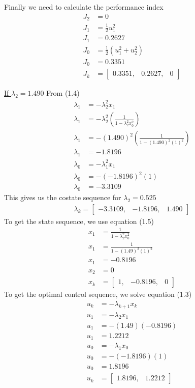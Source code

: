 \documentclass{article}
\begin{document}
  Finally we need to calculate the performance index
  \begin{align*}
	  J_2&=0 \\
	  J_1&=\frac{1}{2}u_1^2 \\
	  J_1&=0.2627 \\
	  J_0&=\frac{1}{2}(u_1^2+u_2^2) \\
	  J_0&=0.3351 \\
	  J_k&=\begin{bmatrix}
		  0.3351, & 0.2627, & 0
	  \end{bmatrix}
  \end{align*}

  \underline{If $\lambda_2=1.490$} \newline \newline
  From (1.4)
  \begin{align*}
	  \lambda_1&=-\lambda_2^2x_1 \\
	  \lambda_1&=-\lambda_2^2(\frac{1}{1-\lambda_2^2x_0^2}) \\
	  \lambda_1&=-(1.490)^2(\frac{1}{1-(1.490)^2(1)^2}) \\
	  \lambda_1&=-1.8196 \\
	  \lambda_0&=-\lambda_1^2x_1 \\
	  \lambda_0&=-(-1.8196)^2(1) \\
	  \lambda_0&=-3.3109
  \end{align*}
  This gives us the costate sequence for $\lambda_2=0.525$
  \begin{align*}
	  \lambda_k=\begin{bmatrix}
		  -3.3109, & -1.8196, & 1.490
	  \end{bmatrix}
  \end{align*}
  To get the state sequence, we use equation (1.5)
  \begin{align*}
	  x_1&=\frac{1}{1-\lambda_2^2x_0^2} \\
	  x_1&=\frac{1}{1-(1.49)^2(1)^2} \\
	  x_1&=-0.8196 \\
	  x_2&=0  \\
	  x_k&=\begin{bmatrix}
		  1, & -0.8196, & 0
	  \end{bmatrix}
  \end{align*}
  To get the optimal control sequence, we solve equation (1.3)
  \begin{align*}
	  u_k&=-\lambda_{k+1}x_k \\
	  u_1&=-\lambda_2x_1 \\
	  u_1&=-(1.49)(-0.8196) \\
	  u_1&=1.2212 \\
	  u_0&=-\lambda_1x_0 \\
	  u_0&=-(-1.8196)(1) \\
	  u_0&=1.8196 \\
	  u_k&=\begin{bmatrix}
		  1.8196, & 1.2212
	  \end{bmatrix}
  \end{align*}
\end{document}
